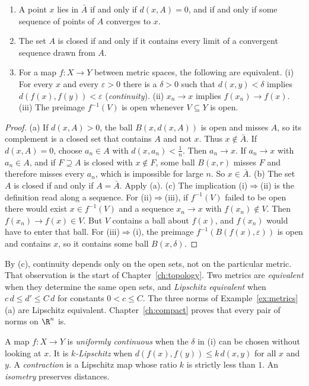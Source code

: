 \begin{proposition}\label{prop:closure}
\begin{enumerate}[label=(\alph*)]
\item A point $x$ lies in $\bar A$ if and only if $d(x,A)=0$, and if and only if some sequence of points of $A$ converges to $x$.
\item The set $A$ is closed if and only if it contains every limit of a convergent sequence drawn from $A$.
\item For a map $f:X\to Y$ between metric spaces, the following are equivalent. (i) For every $x$ and every $\varepsilon>0$ there is a $\delta>0$ such that $d(x,y)<\delta$ implies $d(f(x),f(y))<\varepsilon$ (\emph{continuity}). (ii) $x_n\to x$ implies $f(x_n)\to f(x)$. (iii) The preimage $f^{-1}(V)$ is open whenever $V\subseteq Y$ is open.
\end{enumerate}
\end{proposition}
\begin{proof}
(a) If $d(x,A)>0$, the ball $B(x,d(x,A))$ is open and misses $A$, so its complement is a closed set that contains $A$ and not $x$. Thus $x\notin\bar A$. If $d(x,A)=0$, choose $a_n\in A$ with $d(x,a_n)<\frac1n$. Then $a_n\to x$. If $a_n\to x$ with $a_n\in A$, and if $F\supseteq A$ is closed with $x\notin F$, some ball $B(x,r)$ misses $F$ and therefore misses every $a_n$, which is impossible for large $n$. So $x\in\bar A$. (b) The set $A$ is closed if and only if $A=\bar A$. Apply (a). (c) The implication (i)$\Rightarrow$(ii) is the definition read along a sequence. For (ii)$\Rightarrow$(iii), if $f^{-1}(V)$ failed to be open there would exist $x\in f^{-1}(V)$ and a sequence $x_n\to x$ with $f(x_n)\notin V$. Then $f(x_n)\to f(x)\in V$. But $V$ contains a ball about $f(x)$, and $f(x_n)$ would have to enter that ball. For (iii)$\Rightarrow$(i), the preimage $f^{-1}(B(f(x),\varepsilon))$ is open and contains $x$, so it contains some ball $B(x,\delta)$.
\end{proof}

By (c), continuity depends only on the open sets, not on the particular metric. That observation is the start of Chapter~\ref{ch:topology}. Two metrics are \emph{equivalent} when they determine the same open sets, and \emph{Lipschitz equivalent} when $c\,d\le d'\le C\,d$ for constants $0<c\le C$. The three norms of Example~\ref{ex:metrics}(a) are Lipschitz equivalent. Chapter~\ref{ch:compact} proves that every pair of norms on $\R^n$ is.

\begin{definition}
A map $f:X\to Y$ is \emph{uniformly continuous} when the $\delta$ in (i) can be chosen without looking at $x$. It is \emph{$k$-Lipschitz} when $d(f(x),f(y))\le k\,d(x,y)$ for all $x$ and $y$. A \emph{contraction} is a Lipschitz map whose ratio $k$ is strictly less than $1$. An \emph{isometry} preserves distances.
\end{definition}

